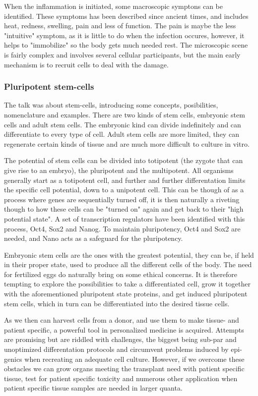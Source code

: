\documentclass[12p]{article}
\begin{document}
When the inflammation is initiated, some macroscopic symptons can be identified.
These symptoms has been described since ancient times, and includes heat, redness, swelling, pain and less of function.
The pain is maybe the less "intuitive" symptom, as it is little to do when the infection occures, however, it helps to "immobilize" so the body gets much needed rest.
The microscopic scene is fairly complex and involves several cellular participants, but the main early mechanism is to recruit cells to deal with the damage. 

\subsubsection{Pluripotent stem-cells}

The talk was about stem-cells, introducing some concepts, posibilities, nomenclature and examples.
There are two kinds of stem cells, embryonic stem cells and adult stem cells.
The embryonic kind can divide indefinitely and can differentiate to every type of cell.
Adult stem cells are more limited, they can regenerate certain kinds of tissue and are much more difficult to culture in vitro.

The potential of stem cells can be divided into totipotent (the zygote that can give rise to an embryo), the pluripotent and the multipotent.
All organisms generally start as a totipotent cell, and further and further differentation limits the specific cell potential, down to a unipotent cell.
This can be though of as a process where genes are sequentially turned off, it is then naturally a riveting though to how these cells can be "turned on" again and get back to their "high potential state".
A set of transcription regulators have been identified with this process, Oct4, Sox2 and Nanog.
To maintain pluripotency, Oct4 and Sox2 are needed, and Nano acts as a safeguard for the pluripotency.

Embryonic stem cells are the ones with the greatest potential, they can be, if held in their proper state, used to produce all the different cells of the body.
The need for fertilized eggs do naturally bring on some ethical concerns.
It is therefore tempting to explore the possibilities to take a differentiated cell, grow it together with the aforementioned pluripotent state proteins, and get induced pluripotent stem cells, which in turn can be differentiated into the desired tissue cells.

As we then can harvest cells from a donor, and use them to make tissue- and patient specific, a powerful tool in personalized medicine is acquired.
Attempts are promising but are riddled with challenges, the biggest being sub-par and unoptimized differentation protocols and circumvent problems induced by epi-genics when recreating an adequate cell culture.
However, if we overcome these obstacles we can grow organs meeting the transplant need with patient specific tissue, test for patient specific toxicity and numerous other application when patient specific tissue samples are needed in larger quanta.
\end{document}
